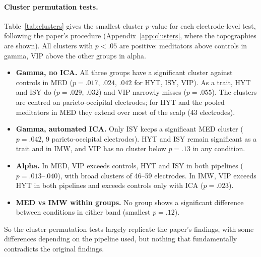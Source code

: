 \documentclass[10pt,a4paper]{article}
\begin{document}
\paragraph{Cluster permutation tests.} Table~\ref{tab:clusters} gives the smallest cluster $p$-value for each
electrode-level test, following the paper's procedure (Appendix~\ref{app:clusters}, where the topographies are
shown). All clusters with $p < .05$ are positive: meditators above controls in gamma, VIP above the other groups
in alpha.
\begin{itemize}
  \item \textbf{Gamma, no ICA.} All three groups have a significant cluster against controls in MED
        ($p = .017$, $.024$, $.042$ for HYT, ISY, VIP). As a trait, HYT and ISY do ($p = .029$, $.032$) and VIP
        narrowly misses ($p = .055$). The clusters are centred on parieto-occipital electrodes; for HYT and the pooled
        meditators in MED they extend over most of the scalp (43 electrodes).
  \item \textbf{Gamma, automated ICA.} Only ISY keeps a significant MED cluster ($p = .042$, 9 parieto-occipital
        electrodes). HYT and ISY remain significant as a trait and in IMW, and VIP has no cluster below $p = .13$
        in any condition.
  \item \textbf{Alpha.} In MED, VIP exceeds controls, HYT and ISY in both pipelines ($p = .013$--$.040$), with
        broad clusters of 46--59 electrodes. In IMW, VIP exceeds HYT in both pipelines and exceeds controls only
        with ICA ($p = .023$).
  \item \textbf{MED vs IMW within groups.} No group shows a significant difference between conditions in either
        band (smallest $p = .12$).
\end{itemize}
So the cluster permutation tests largely replicate the paper's findings, with some differences 
depending on the pipeline used, but nothing that fundamentally contradicts the original findings.

\begin{table}[htbp]
\centering\small

\caption{Cluster permutation tests over electrodes: smallest cluster $p$-value, with the number of electrodes in
that cluster in brackets; $p < .05$ in bold; -- means no electrode passed the cluster-forming threshold. Two-tailed,
2000 permutations, 63 subjects.}
\label{tab:clusters}
\end{table}
\end{document}
